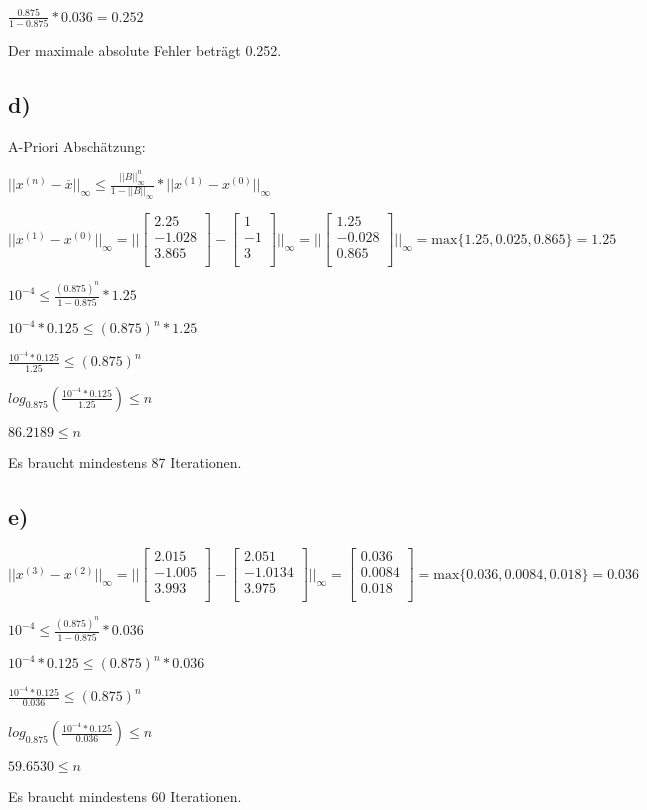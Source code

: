 \documentclass{article}
\begin{document}
\(\frac{0.875}{1 - 0.875} * 0.036 = 0.252\)

Der maximale absolute Fehler beträgt 0.252.

\subsection*{d)}

A-Priori Abschätzung:

\(||x^{(n)} - \overset{\_}{x}||_\infty \leq \frac{||B||_\infty^n}{1 - ||B||_\infty} * ||x^{(1)} - x^{(0)}||_\infty\)

\(
||x^{(1)} - x^{(0)}||_\infty
=
||
\begin{bmatrix} 
2.25\\
-1.028\\
3.865\\
\end{bmatrix}
-
\begin{bmatrix} 
1\\
-1\\
3\\
\end{bmatrix}
||_\infty
=
||
\begin{bmatrix} 
1.25\\
-0.028\\
0.865\\
\end{bmatrix}
||_\infty
=
\text{max}\{1.25,0.025,0.865\} = 1.25
\)

\(10^{-4} \leq \frac{(0.875)^n}{1 - 0.875} * 1.25\)

\(10^{-4}*0.125 \leq (0.875)^n * 1.25\)

\(\frac{10^{-4}*0.125}{1.25} \leq (0.875)^n\)

\(log_{0.875}\left(\frac{10^{-4}*0.125}{1.25}\right) \leq n\)

\(86.2189 \leq n\)

Es braucht mindestens 87 Iterationen.

\newpage
\subsection*{e)}

\(
||x^{(3)} - x^{(2)}||_\infty
=
||
\begin{bmatrix} 
2.015\\
-1.005\\
3.993\\
\end{bmatrix}
-
\begin{bmatrix} 
2.051\\
-1.0134\\
3.975\\
\end{bmatrix}
||_\infty
=
\begin{bmatrix} 
0.036\\
0.0084\\
0.018\\
\end{bmatrix}
=
\text{max}\{0.036,0.0084,0.018\}
=
0.036
\)

\(10^{-4} \leq \frac{(0.875)^n}{1 - 0.875} * 0.036\)

\(10^{-4}*0.125 \leq (0.875)^n * 0.036\)

\(\frac{10^{-4}*0.125}{0.036} \leq (0.875)^n\)

\(log_{0.875}\left(\frac{10^{-4}*0.125}{0.036}\right) \leq n\)

\(59.6530 \leq n\)

Es braucht mindestens 60 Iterationen.
\end{document}
